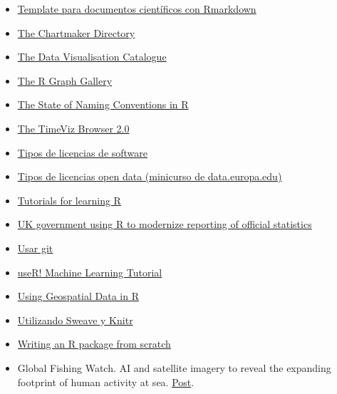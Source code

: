 \documentclass[
]{article}
\begin{document}
\begin{itemize}
\item
  \href{http://www.petrkeil.com/?p=2401}{Template para documentos
  científicos con Rmarkdown}
\item
  \href{chartmaker.visualisingdata.com}{The Chartmaker Directory}
\item
  \href{https://datavizcatalogue.com/}{The Data Visualisation Catalogue}
\item
  \href{https://r-graph-gallery.com/}{The R Graph Gallery}
\item
  \href{https://journal.r-project.org/archive/2012-2/RJournal_2012-2_Baaaath.pdf}{The
  State of Naming Conventions in R}
\item
  \href{https://browser.timeviz.net/}{The TimeViz Browser 2.0}
\item
  \href{https://choosealicense.com/licenses/}{Tipos de licencias de
  software}
\item
  \href{https://data.europa.eu/en/academy/open-data-licensing}{Tipos de
  licencias open data (minicurso de data.europa.edu)}
\item
  \href{https://www.r-bloggers.com/how-to-learn-r-2/}{Tutorials for
  learning R}
\item
  \href{https://www.r-bloggers.com/uk-government-using-r-to-modernize-reporting-of-official-statistics/}{UK
  government using R to modernize reporting of official statistics}
\item
  \href{https://try.github.io/levels/1/challenges/1}{Usar git}
\item
  \href{https://github.com/ledell/useR-machine-learning-tutorial}{useR!
  Machine Learning Tutorial}
\item
  \href{https://www.mzes.uni-mannheim.de/socialsciencedatalab/article/geospatial-data/}{Using
  Geospatial Data in R}
\item
  \href{https://support.posit.co/hc/en-us/articles/200552056-Using-Sweave-and-knitr}{Utilizando
  Sweave y Knitr}
\item
  \href{https://hilaryparker.com/2014/04/29/writing-an-r-package-from-scratch/}{Writing
  an R package from scratch}
\item
  Global Fishing Watch. AI and satellite imagery to reveal the expanding
  footprint of human activity at sea.
  \href{https://globalfishingwatch.org/press-release/new-research-harnesses-ai-and-satellite-imagery-to-reveal-the-expanding-footprint-of-human-activity-at-sea/?utm_source=GFW+subscribers&utm_campaign=9363c93195-EMAIL_CAMPAIGN_JAN_2024_CURRENT_ENGLISH&utm_medium=email&utm_term=0_-9363c93195-\%5BLIST_EMAIL_ID\%5D}{Post}.

\end{itemize}
\end{document}
